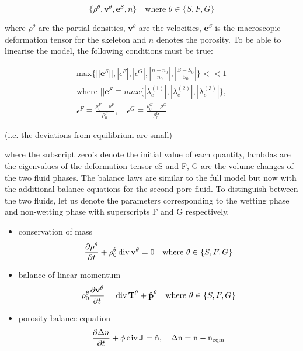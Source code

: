\documentclass[twocolumn]{article}
\begin{document}
\begin{equation}
    \{\rho^\theta, \textbf{v}^\theta, \textbf{e}^S, n\} \quad\text{where $\theta \in \{S, F, G\}$}
\end{equation}

where $\rho^\theta$ are the partial densities, $\textbf{v}^\theta$ are the velocities, $\textbf{e}^S$ is the macroscopic deformation tensor for the skeleton and $n$ denotes the porosity. To be able to linearise the model, the following conditions must be true:

\begin{gather}
    \textrm{max}\{||\textbf{e}^S||, |\epsilon^F|, |\epsilon^G|, |\frac{n - n_0}{n_0}|, |\frac{S - S_0}{S_0}|\} << 1 \\
    \text{where~} ||\textbf{e}^S \equiv max\{|\lambda_e^{(1)}|, |\lambda_e^{(2)}|, |\lambda_e^{(3)}|\},\\
    \epsilon^F \equiv\frac{\rho_0^F - \rho^F}{\rho_0^F}, \quad\epsilon^G \equiv\frac{\rho_0^G - \rho^G}{\rho_0^G}
\end{gather}

(i.e. the deviations from equilibrium are small)

where the subscript zero’s denote the initial value of each quantity, lambdas are the eigenvalues of the deformation tensor eS and F, G are the volume changes of the two fluid phases.
The balance laws are similar to the full model but now with the additional balance equations for the second pore fluid. To distinguish between the two fluids, let us denote the parameters corresponding to the wetting phase and non-wetting phase with superscripts F and G respectively.

\begin{itemize}
    \item conservation of mass
          \begin{equation}
              \frac{\partial{\rho^\theta}}{\partial{t}} +
              \rho_0^\theta\,\rm{div}\,{\textbf{v}^\theta} = 0 \quad\text{where $\theta \in \{S, F, G\}$}
          \end{equation}
    \item balance of linear momentum
          \begin{equation}
              \rho_0^\theta\frac{\partial{\textbf{v}^\theta}}{\partial{t}} = \rm{div}\,\textbf{T}^\theta + \hat{\textbf{p}}^\theta \quad\text{where $\theta \in \{S, F, G\}$}
          \end{equation}
    \item porosity balance equation
          \begin{equation}
              \frac{\partial \Delta{n}}{\partial t} + \phi\,\rm{div}\,\textbf{J} = \hat{n},
              \quad \Delta{n} = n - n_{eqm}
          \end{equation}
\end{itemize}
\end{document}
